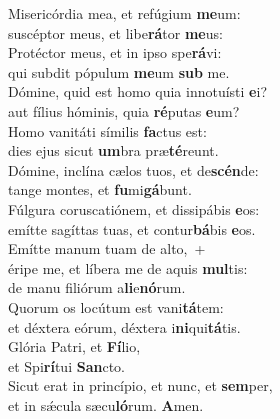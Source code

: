 \evenverse Misericórdia mea, et refúgium \textbf{me}um:~\*\\
\evenverse suscéptor meus, et libe\textbf{rá}tor \textbf{me}us:\\
\oddverse Protéctor meus, et in ipso spe\textbf{rá}vi:~\*\\
\oddverse qui subdit pópulum \textbf{me}um \textbf{sub} me.\\
\evenverse Dómine, quid est homo quia innotuísti \textbf{e}i?~\*\\
\evenverse aut fílius hóminis, quia \textbf{ré}putas \textbf{e}um?\\
\oddverse Homo vanitáti símilis \textbf{fa}ctus est:~\*\\
\oddverse dies ejus sicut \textbf{um}bra præ\textbf{té}reunt.\\
\evenverse Dómine, inclína cælos tuos, et de\textbf{scén}de:~\*\\
\evenverse tange montes, et \textbf{fu}mi\textbf{gá}bunt.\\
\oddverse Fúlgura coruscatiónem, et dissipábis \textbf{e}os:~\*\\
\oddverse emítte sagíttas tuas, et contur\textbf{bá}bis \textbf{e}os.\\
\evenverse Emítte manum tuam de alto,~+\\
\evenverse  éripe me, et líbera me de aquis \textbf{mul}tis:~\*\\
\evenverse de manu filiórum a\textbf{li}e\textbf{nó}rum.\\
\oddverse Quorum os locútum est vani\textbf{tá}tem:~\*\\
\oddverse et déxtera eórum, déxtera i\textbf{ni}qui\textbf{tá}tis.\\
\evenverse Glória Patri, et \textbf{Fí}lio,~\*\\
\evenverse et Spi\textbf{rí}tui \textbf{San}cto.\\
\oddverse Sicut erat in princípio, et nunc, et \textbf{sem}per,~\*\\
\oddverse et in sǽcula sæcu\textbf{ló}rum. \textbf{A}men.\\
